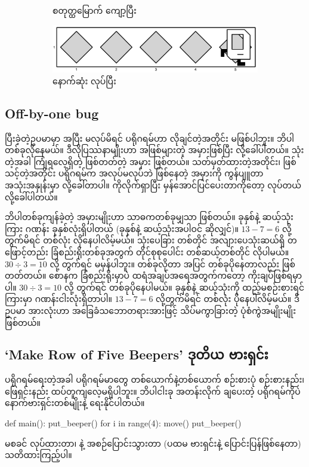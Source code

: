 \begin{figure}[thb!]
\begin{subfigure}[t]{{\figpctw}\textwidth}
        \caption{စတုတ္ထမြောက် ကျော့ပြီး}    
    \end{subfigure}
    \begin{subfigure}[t]{{\figpctw}\textwidth}
        \includegraphics[scale=0.15]{images/ch02/mrofb/after.jpg}
        \caption{နောက်ဆုံး  လုပ်ပြီး}    
    \end{subfigure}
    \caption{}
    \label{fig:mrofb_iters}
\end{figure}

\subsection*{Off-by-one bug}

ပြီးခဲ့တဲ့ဥပမာမှာ   အပြီး  မလုပ်မိရင် ပရိုဂရမ်ဟာ လိုချင်တဲ့အတိုင်း မဖြစ်ပါဘူး။  ဘိပါတစ်ခုလိုနေမယ်။ ဒီလိုပြဿနာမျိုးဟာ အဖြစ်များတဲ့ အမှားဖြစ်ပြီး  လို့ခေါ်ပါတယ်။  သုံးတဲ့အခါ ကြုံရလေ့ရှိတဲ့ ဖြစ်တတ်တဲ့ အမှား  ဖြစ်တယ်။ သတ်မှတ်ထားတဲ့အတိုင်း၊ ဖြစ်သင့်တဲ့အတိုင်း ပရိုဂရမ်က အလုပ်မလုပ်ဘဲ ဖြစ်နေတဲ့ အမှားကို ကွန်ပျူတာအသုံးအနှုန်းမှာ  လို့ခေါ်တာပါ။  ကိုလိုက်ရှာပြီး မှန်အောင်ပြင်ပေးတာကိုတော့  လုပ်တယ်လို့ခေါ်ပါတယ်။

ဘိပါတစ်ခုကျန်ခဲ့တဲ့ အမှားမျိုးဟာ  သာဓကတစ်ခုမျှသာ ဖြစ်တယ်။ ခုနှစ်နဲ့ ဆယ့်သုံးကြား ဂဏန်း ခုနှစ်လုံးရှိပါတယ် (ခုနှစ်နဲ့ ဆယ့်သုံးအပါဝင် ဆိုလျှင်)။  \(13 - 7 = 6\) လို့တွက်မိရင် တစ်လုံး လိုနေပါလိမ့်မယ်။ သုံးပေခြား တစ်တိုင် အလျားပေသုံးဆယ်ရှိ တဖြောင့်တည်း ခြံစည်းရိုးတစ်ခုအတွက် တိုင်စုစုပေါင်း တစ်ဆယ့်တစ်တိုင် လိုပါမယ်။ \(30 \div 3 = 10\) လို့ တွက်ရင် မမှန်ပါဘူး။ တစ်ခုလိုတာ အပြင် တစ်ခုပိုနေတာလည်း ဖြစ်တတ်တယ်။ စောနက ခြံစည်းရိုးမှာပဲ ထရံအချပ်အရေအတွက်ကတော့ ကိုးချပ်ဖြစ်ရမှာပါ။ \(30 \div 3 = 10\) လို့ တွက်ရင် တစ်ခုပိုနေပါမယ်။ ခုနှစ်နဲ့ ဆယ့်သုံးကို ထည့်မစဉ်းစားရင် ကြားမှာ ဂဏန်းငါးလုံးရှိတာပါ။ \(13 - 7 = 6\) လို့တွက်မိရင် တစ်လုံး ပိုနေပါလိမ့်မယ်။ ဒီ ဥပမာ အားလုံးဟာ အခြေခံသဘောတရားအားဖြင့် သိပ်မကွာခြားတဲ့  ပုံစံကွဲအမျိုးမျိုး ဖြစ်တယ်။

\subsection*{‘Make Row of Five Beepers’ ဒုတိယ ဗားရှင်း}
ပရိုဂရမ်ရေးတဲ့အခါ ပရိုဂရမ်မာတွေ တစ်ယောက်နဲ့တစ်ယောက် စဉ်းစားပုံ စဉ်းစားနည်း၊ ဖြေရှင်းနည်း ထပ်တူကျလေ့မရှိပါဘူး။ ဘိပါငါးခု အတန်းလိုက် ချပေးတဲ့ ပရိုဂရမ်ကိုပဲ နောက်ဗားရှင်းတစ်မျိုးနဲ့ ရေးနိုင်ပါတယ်။
%
\begin{py}
def main():
    put_beeper()
    for i in range(4):
        move()
        put_beeper()
\end{py}
%
  မစခင်  လုပ်ထားတာ၊  နဲ့  အစဉ်ပြောင်းသွားတာ (ပထမ ဗားရှင်းနဲ့ ပြောင်းပြန်ဖြစ်နေတာ) သတိထားကြည့်ပါ။

